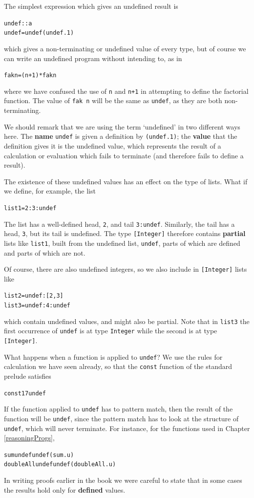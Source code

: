 The simplest expression which gives an undefined result is 
\begin{alltt}
undef :: a
undef = undef\hfill(undef.1)
\end{alltt}
which gives a non-terminating or
undefined value of every type, but of course we can write an
undefined program without intending to, as in
\begin{alltt}
fak n = (n+1) * fak n
\end{alltt}
where we have confused the use of \texttt{n} and \texttt{n+1} in
attempting to define the
factorial function. The value of \texttt{fak n} will be the same as \texttt{undef}, as they
are both non-terminating.

We should remark that we
are using the term `undefined' in two different ways here. The \textbf{name}
\texttt{undef} is given a definition by \texttt{(undef.1)}; the \textbf{value} that the
definition gives it is the undefined value, which represents the result of a
calculation or evaluation which fails to terminate (and therefore fails to
define a result).

The existence of these undefined values has an effect on the type of lists.
What if we define, for example, the list
\begin{alltt}
list1 = 2:3:undef
\end{alltt}
The list has a well-defined head, \texttt{2}, and tail \texttt{3:undef}. Similarly,
the tail has a head, \texttt{3}, but its tail is undefined. The type \texttt{[Integer]}
therefore contains \textbf{partial} lists 
like \texttt{list1}, built from the
undefined list, \texttt{undef}, parts of which are defined and parts of which are
not.

Of course, there are also undefined
integers, so we also include in \texttt{[Integer]} lists like
\begin{alltt}
list2 = undef:[2,3]
list3 = undef:4:undef
\end{alltt}
which contain undefined values, and might also be partial. Note that in 
\texttt{list3} the first occurrence of \texttt{undef} is at type \texttt{Integer} while the
second is at type \texttt{[Integer]}.

What happens when a function is applied to \texttt{undef}? We use the rules for
calculation we have seen already, so that the \texttt{const} function of the 
standard prelude satisfies
\begin{alltt}
const 17 undef 
\end{alltt}
If the function applied to \texttt{undef} has to pattern match, then the result of
the function will be \texttt{undef}, since the pattern match has to look at the
structure of \texttt{undef}, which will never terminate. For instance, for the
functions used in Chapter \ref{reasoningProgs},
\begin{alltt}
sum undef       \step undef \hfill (sum.u)
doubleAll undef \step undef \hfill (doubleAll.u)
\end{alltt}
In writing proofs earlier in the book we were careful to state that in some
cases the results hold only for \textbf{defined} values. 


